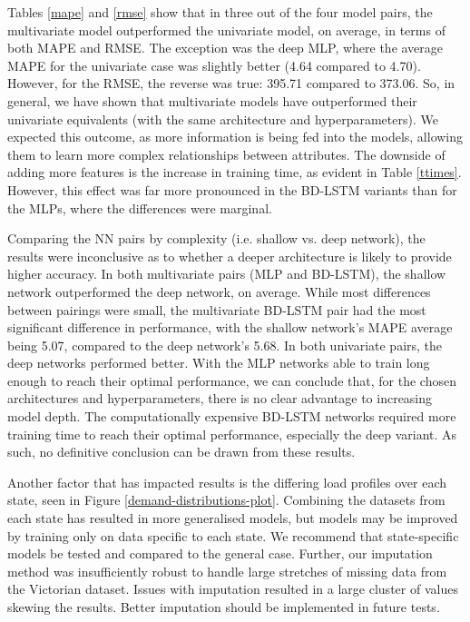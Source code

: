 \documentclass[mstat,12pt]{unswthesis}
\begin{document}
Tables \ref{mape} and \ref{rmse} show that in three out of the four model pairs, the multivariate model outperformed the univariate model, on average, in terms of both MAPE and RMSE. The exception was the deep MLP, where the average MAPE for the univariate case was slightly better (4.64 compared to 4.70). However, for the RMSE, the reverse was true: 395.71 compared to 373.06. So, in general, we have shown that multivariate models have outperformed their univariate equivalents (with the same architecture and hyperparameters). We expected this outcome, as more information is being fed into the models, allowing them to learn more complex relationships between attributes. The downside of adding more features is the increase in training time, as evident in Table \ref{ttimes}. However, this effect was far more pronounced in the BD-LSTM variants than for the MLPs, where the differences were marginal.

Comparing the NN pairs by complexity (i.e. shallow vs. deep network), the results were inconclusive as to whether a deeper architecture is likely to provide higher accuracy. In both multivariate pairs (MLP and BD-LSTM), the shallow network outperformed the deep network, on average. While most differences between pairings were small, the multivariate BD-LSTM pair had the most significant difference in performance, with the shallow network's MAPE average being 5.07, compared to the deep network's 5.68. In both univariate pairs, the deep networks performed better. With the MLP networks able to train long enough to reach their optimal performance, we can conclude that, for the chosen architectures and hyperparameters, there is no clear advantage to increasing model depth. The computationally expensive BD-LSTM networks required more training time to reach their optimal performance, especially the deep variant. As such, no definitive conclusion can be drawn from these results.

Another factor that has impacted results is the differing load profiles over each state, seen in Figure \ref{demand-distributions-plot}. Combining the datasets from each state has resulted in more generalised models, but models may be improved by training only on data specific to each state. We recommend that state-specific models be tested and compared to the general case. Further, our imputation method was insufficiently robust to handle large stretches of missing data from the Victorian dataset. Issues with imputation resulted in a large cluster of values skewing the results. Better imputation should be implemented in future tests.
\end{document}
